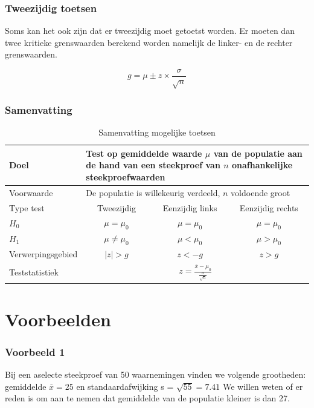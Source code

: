 \documentclass{beamer}
\begin{document}
\begin{frame}
  \frametitle{Tweezijdig toetsen}
  Soms kan het ook zijn dat er tweezijdig moet getoetst worden. Er moeten dan twee kritieke grenswaarden berekend worden namelijk de linker- en de rechter grenswaarden.

\begin{equation}
  g = \mu \pm z \times \frac{\sigma}{\sqrt{n}}
  \label{eq:kritiekeGrenswaarde}
\end{equation}
\end{frame}

\begin{frame}
  \frametitle{Samenvatting}

\begin{table}
  \centering
  \begin{tabular}{l|ccc}
    \toprule
    Doel              & \multicolumn{3}{l}{\parbox{.7\textwidth}{Test op gemiddelde waarde $\mu$ van de populatie aan de hand van een steekproef van $n$ onafhankelijke steekproefwaarden}} \\
    \midrule
    Voorwaarde        & \multicolumn{3}{l}{\parbox{.7\textwidth}{De populatie is willekeurig verdeeld, $n$ voldoende groot}} \\
    \midrule
    Type test         & Tweezijdig           & Eenzijdig links & Eenzijdig rechts \\
    \midrule
    $H_{0}$           & $\mu = \mu_{0}$      & $\mu = \mu_{0}$ & $\mu = \mu_{0}$  \\
    $H_{1}$           & $\mu \neq \mu_{0}$   & $\mu < \mu_{0}$ & $\mu > \mu_{0}$  \\
    Verwerpingsgebied & $\left|z\right| > g$ & $z< -g $        & $z>g$            \\
    Teststatistiek    & \multicolumn{3}{c}{$z = \frac{\overline{x} - \mu_{0}}{\frac{\sigma}{\sqrt{n}}}$} \\
    \bottomrule
  \end{tabular}
  \caption{Samenvatting mogelijke toetsen}
  \label{tab:toetsingsprocedures}
\end{table}
\end{frame}

\section{Voorbeelden}
\sectionframelogo{}

\begin{frame}
  \frametitle{Voorbeeld 1}
  Bij een aselecte steekproef van 50 waarnemingen vinden we volgende grootheden: gemiddelde $\overline{x} = 25$ en standaardafwijking s = $\sqrt{55} = 7.41$
  We willen weten of er reden is om aan te nemen dat gemiddelde van de populatie kleiner is dan 27.

\end{frame}
\end{document}
